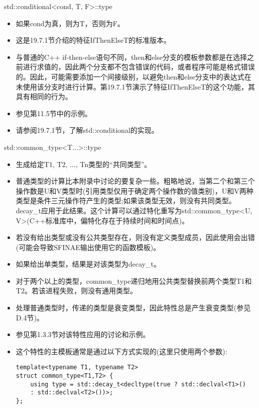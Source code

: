 std::conditional<cond, T, F>::type

\begin{itemize}
\item
如果cond为真，则为T，否则为F。

\item
这是19.7.1节介绍的特征IfThenElseT的标准版本。

\item
与普通的C++ if-then-else语句不同，then和else分支的模板参数都是在选择之前进行求值的，因此两个分支都不包含错误的代码，或者程序可能是格式错误的。因此，可能需要添加一个间接级别，以避免then和else分支中的表达式在未使用该分支时进行计算。第19.7.1节演示了特征IfThenElseT的这个功能，其具有相同的行为。

\item
参见第11.5节中的示例。

\item
请参阅19.7.1节，了解std::conditional的实现。
\end{itemize}

std::common\_type<T...>::type

\begin{itemize}
\item
生成给定T1, T2, ..., Tn类型的“共同类型”。

\item
普通类型的计算比本附录中讨论的要复杂一些。粗略地说，当第二个和第三个操作数是U和V类型时(引用类型仅用于确定两个操作数的值类别)，U和V两种类型是条件三元操作符产生的类型;如果该类型无效，则没有共同类型。decay\_t应用于此结果。这个计算可以通过特化重写为std::common\_type<U, V>(C++标准库中，偏特化存在于持续时间和时间点)。

\item
若没有给出类型或没有公共类型存在，则没有定义类型成员，因此使用会出错(可能会导致SFINAE输出使用它的函数模板)。

\item
如果给出单类型，结果是对该类型为decay\_t。

\item
对于两个以上的类型，common\_type递归地用公共类型替换前两个类型T1和T2。若该进程失败，则没有通用类型。

\item
处理普通类型时，传递的类型是衰变类型，因此特性总是产生衰变类型(参见D.4节)。

\item
参见第1.3.3节对该特性应用的讨论和示例。

\item
这个特性的主模板通常是通过以下方式实现的(这里只使用两个参数):

\begin{lstlisting}[style=styleCXX]
template<typename T1, typename T2>
struct common_type<T1,T2> {
	using type = std::decay_t<decltype(true ? std::declval<T1>()
	: std::declval<T2>())>;
};
\end{lstlisting}
\end{itemize}

